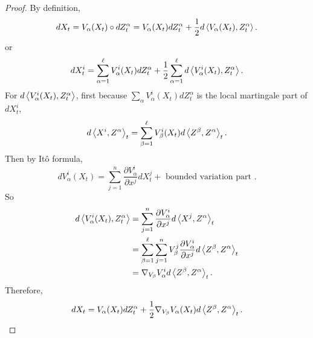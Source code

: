\begin{proof}
    By definition,
    \begin{equation*}
    	dX_t = V_\alpha(X_t) \circ dZ^\alpha_t = V_\alpha(X_t)dZ^\alpha_t + \frac{1}{2}d \left\langle V_\alpha(X_t),Z^\alpha_t \right\rangle.
    \end{equation*}
    or
    \begin{equation*}
    	dX^i_t = \sum_{\alpha=1}^\ell V^i_\alpha(X_t)dZ^\alpha_t + \frac{1}{2} \sum_{\alpha=1}^\ell d \left\langle V^i_\alpha(X_t),Z^\alpha_t \right\rangle.
    \end{equation*}
    For $d\left\langle V^i_\alpha(X_t),Z^\alpha_t \right\rangle$, first because $\sum_{\alpha} V^i_\alpha(X_t)dZ^\alpha_t$ is the local martingale part of $dX^i_t$,
    \begin{equation*}
    	d\left\langle X^i,Z^\alpha \right\rangle_t = \sum_{\beta=1}^\ell V^i_\beta(X_t) d \left\langle Z^\beta,Z^\alpha \right\rangle_t.
    \end{equation*}
    Then by It\^o formula,
    \begin{equation*}
    	dV^i_\alpha(X_t) = \sum_{j=1}^n \frac{\partial V^i_\alpha}{\partial x^j}dX_t^j + \text{ bounded variation part }.
    \end{equation*}
    So
    \begin{align*}
    	d\left\langle V^i_\alpha(X_t),Z^\alpha_t \right\rangle &= \sum_{j=1}^n \frac{\partial V^i_\alpha}{\partial x^j} d \left\langle X^j, Z^\alpha \right\rangle_t\\
    	&= \sum_{\beta = 1}^\ell \sum_{j=1}^n V_\beta^j\frac{\partial V^i_\alpha}{\partial x^j} d \left\langle Z^\beta,Z^\alpha \right\rangle_t\\
    	&= \nabla_{V_\beta} V^i_\alpha d \left\langle Z^\beta,Z^\alpha \right\rangle_t.
    \end{align*}
    Therefore,
    \begin{equation*}
    	dX_t = V_\alpha(X_t)dZ^\alpha_t + \frac{1}{2}\nabla_{V_\beta} V_\alpha (X_t) d \left\langle Z^\beta,Z^\alpha \right\rangle_t. \qedhere
    \end{equation*}
\end{proof}
